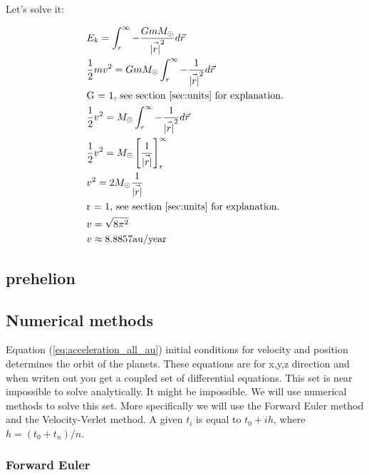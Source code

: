 Let's solve it: 

\begin{align*}
	&E_k =\int_r^\infty -\frac{GmM_\odot}{\vec{|r|}^2} d\vec{r}
	\\
	&\frac{1}{2}mv^2 = GmM_\odot \int_r^\infty -\frac{1}{\vec{|r|}^2} d\vec{r}
	\\
	&\text{G = 1, see section \ref{sec:units} for explanation.}
	\\
	&\frac{1}{2}v^2 = M_\odot \int_r^\infty -\frac{1}{\vec{|r|}^2} d\vec{r}
	\\
	&\frac{1}{2}v^2 = M_\odot \left[ \frac{1}{\vec{|r|}} \right]_r^\infty
	\\
	&v^2 = 2M_\odot \frac{1}{\vec{|r|}}
	\\
	&\text{r = 1, see section \ref{sec:units} for explanation.}
	\\
	&v = \sqrt{8\pi^2}
	\\
	&v \approx 8.8857 \rm{au/year}
\end{align*}




\subsection{prehelion}


















\subsection{Numerical methods}

Equation (\ref{eq:acceleration_all_au}) initial conditions for velocity and position determines the orbit of the planets. 
These equations are for x,y,z direction and when writen out you get a coupled set of differential equations. This set is near impossible to solve analytically. It might be impossible. We will use numerical methods to solve this set. More specifically we will use the Forward Euler method and the Velocity-Verlet method. A given $t_i$ is equal to $t_0 + ih$, where $h = (t_{0} + t_{n})/n $.

\subsubsection{Forward Euler}


